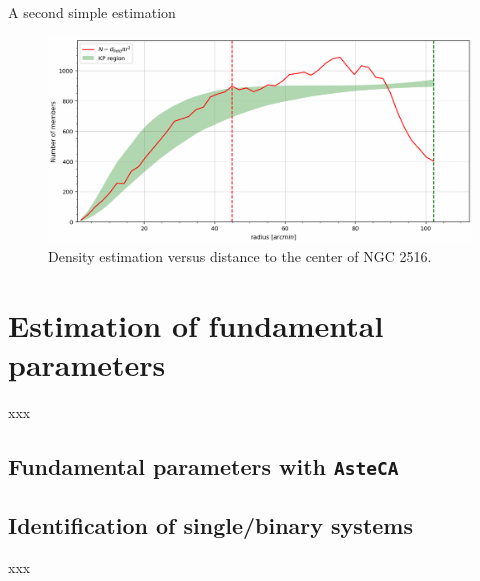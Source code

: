 \documentclass[draft]{aa}
\begin{document}
 A second simple estimation 



  \begin{figure}
  \centering
  \includegraphics[width=\hsize]{figs/dens_vs_rad.png}
  \caption{Density estimation versus distance to the center of NGC 2516.}
  \label{fig:dens_vs_rad}
  \end{figure}






\section{Estimation of fundamental parameters}
 \label{sec:fund_pars}

 xxx


  \subsection{Fundamental parameters with \texttt{AsteCA}}
   \label{ssec:asteca}



  \subsection{Identification of single/binary systems}
   \label{ssec:id_single_binaries}

   xxx
   
\end{document}
